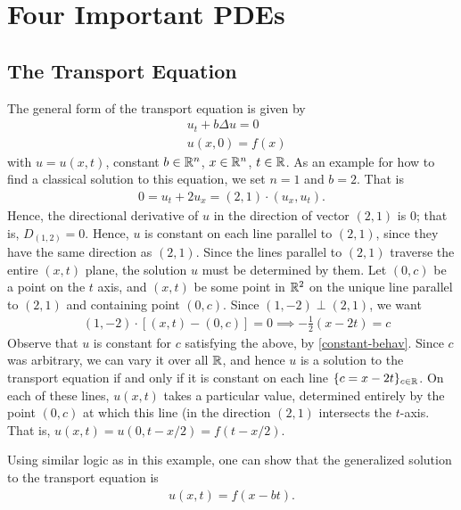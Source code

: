 \chapter{Four Important PDEs}
\section{The Transport Equation}
The general form of the transport equation is given by
\begin{equation*}
\begin{split}
	& u_{t}  + b\Delta u = 0
	\\
	& u(x,0) = f(x)
\end{split}
\end{equation*}
with $u = u(x,t)$, constant $b \in \mathbb{R}^n$, $x \in \mathbb{R}^{n}$, $t \in \mathbb{R}$.
As an example for how to find a classical solution to this equation, we set
$n = 1$ and $b=2$. That is
\begin{equation}
	\label{constant-behav}
\begin{split}
	0 = u_{t} + 2 u _{x} = (2,1) \cdot (u_{x}, u_{t}).
\end{split}
\end{equation}
Hence, the directional derivative of $u$ in the direction of vector $(2,1)$ is
0; that is, $D_{(1,2)} = 0$. Hence, $u$ is constant on each line parallel to
$(2,1)$, since they have the same direction as $(2,1)$. Since the lines parallel
to $(2,1)$ traverse the entire $(x,t)$ plane, the solution $u$ must be
determined by them. Let $(0,c)$ be a point on the $t$ axis, and $(x,t)$ be some
point in $\mathbb{R}^{2}$ on the unique line parallel to $(2,1)$ and containing point
$(0,c)$. Since $(1,-2) \perp (2,1)$, we want
\begin{equation*}
\begin{split}
	& (1,-2) \cdot \left[ (x,t) - (0,c) \right] = 0
	\implies -\frac{1}{2}(x-2t) = c
\end{split}
\end{equation*}
Observe that $u$ is constant for $c$ satisfying the above, by
\eqref{constant-behav}. Since $c$ was arbitrary, we can vary it over all $\mathbb{R}$,
and hence $u$ is a solution to the transport equation if and only if it is
constant on each line $\{ c = x-2t\}_{c \in \mathbb{R}}$. 
On each of these lines, $u(x,t)$ takes a particular value, determined entirely
by the point $(0,c)$ at which this line (in the direction $(2,1)$ intersects the
$t$-axis. That is, $u(x,t) = u(0, t-x/2) = f(t-x/2)$.

Using similar logic as in this example, one can show that the generalized
solution to the transport equation is
\begin{equation*}
\begin{split}
	u(x,t) = f(x-bt).
\end{split}
\end{equation*}

